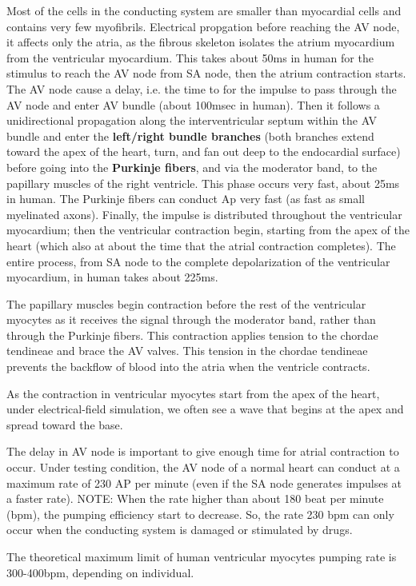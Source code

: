 Most of the cells in the conducting system are smaller than myocardial cells and
contains very few myofibrils. Electrical propgation before reaching the AV node,
it affects only the atria, as the fibrous skeleton isolates the atrium
myocardium from the ventricular myocardium. This takes about 50ms in human for
the stimulus to reach the AV node from SA node, then the atrium contraction
starts. The AV node cause a delay, i.e. the time to for the impulse to pass
through the AV node and enter AV bundle (about 100msec in human).
Then it follows a unidirectional propagation along the interventricular septum
within the AV bundle and enter the {\bf left/right bundle branches} (both
branches extend toward the apex of the heart, turn, and fan out deep to the
endocardial surface) before going into the {\bf Purkinje fibers}, and via the
moderator band, to the papillary muscles of the right ventricle. This phase
occurs very fast, about 25ms in human. The Purkinje fibers can conduct Ap very
fast (as fast as small myelinated axons). Finally, the impulse is distributed
throughout the ventricular myocardium; then the ventricular contraction begin,
starting from the apex of the heart (which also at about the time that the
atrial contraction completes). The entire process, from SA node to the complete
depolarization of the ventricular myocardium, in human takes about 225ms.

The papillary muscles begin contraction before the rest of the ventricular
myocytes as it receives the signal through the moderator band, rather than
through the Purkinje fibers. This contraction applies tension to the chordae
tendineae and brace the AV valves. This tension in the chordae tendineae
prevents the backflow of blood into the atria when the ventricle contracts. 

As the contraction in ventricular myocytes start from the apex of the heart,
under electrical-field simulation, we often see a wave that begins at the apex
and spread toward the base.

\begin{framed}
The delay in AV node is important  to give enough time for atrial contraction to
occur. Under testing condition, the AV node of a normal heart can conduct at a maximum rate of 230 AP
per minute (even if the SA node generates impulses at a faster rate). NOTE: When the
rate higher than about 180 beat per minute (bpm), the pumping efficiency start
to decrease. So, the rate 230 bpm can only occur when the conducting system is
damaged or stimulated by drugs.

The theoretical maximum limit of human ventricular myocytes pumping rate is
300-400bpm, depending on individual. 
\end{framed}



